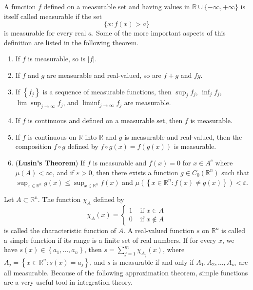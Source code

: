 \begin{para}
  A function $f$ defined on a measurable set and having values in $\mathbb{R} \cup\{-\infty,+\infty\}$ is itself called measurable if the set
  \[
  \{x: f(x)>a\}
  \]
  is measurable for every real $a$. Some of the more important aspects of this definition are listed in the following theorem.
\end{para}


\begin{theorem}
  \begin{enumerate}[label = (\alph*)]
    \item If $f$ is measurable, so is $|f|$.
    \item If $f$ and $g$ are measurable and real-valued, so are $f+g$ and $f g$.
    \item If $\left\{f_j\right\}$ is a sequence of measurable functions,
      then $\sup_j f_j$, $\inf_j f_j$, $\lim \sup_{j \rightarrow \infty} f_j$,
      and $\liminf_{j \rightarrow \infty} f_j$ are measurable.
    \item If $f$ is continuous and defined on a measurable set, then $f$ is measurable.
    \item If $f$ is continuous on $\mathbb{R}$ into $\mathbb{R}$ and $g$ is measurable and 
      real-valued, then the composition $f \circ g$ defined by $f \circ g(x)=f(g(x))$ is 
      measurable.
    \item (\textbf{Lusin's Theorem}) If $f$ is measurable and $f(x)=0$ for $x \in A^c$ 
      where $\mu(A)<\infty$, and if $\varepsilon>0$, then there exists a function
      $g \in C_0\left(\mathbb{R}^n\right)$ such that
      $\sup _{x \in \mathbb{R}^n} g(x)\leq \sup_{x \in \mathbb{R}^n} f(x)$
      and $\mu\left(\left\{x \in \mathbb{R}^n: f(x) \neq g(x)\right\}\right)<\varepsilon$.
  \end{enumerate}
\end{theorem}

\begin{para}
  Let $A \subset \mathbb{R}^n$. The function $\chi_A$ defined by
  \[
  \chi_A(x)= \begin{cases}1 & \text { if } x \in A \\ 0 & \text { if } x \notin A\end{cases}
  \]
  is called the characteristic function of $A$. A real-valued function $s$ on $\mathbb{R}^n$ is called a simple function if its range is a finite set of real numbers. If for every $x$, we have $s(x) \in\left\{a_1, \ldots, a_n\right\}$, then $s=\sum_{j=1}^m \chi_{A_j}(x)$, where $A_j=\left\{x \in \mathbb{R}^n: s(x)=a_j\right\}$, and $s$ is measurable if and only if $A_1, A_2, \ldots, A_m$ are all measurable. Because of the following approximation theorem, simple functions are a very useful tool in integration theory.
\end{para}

